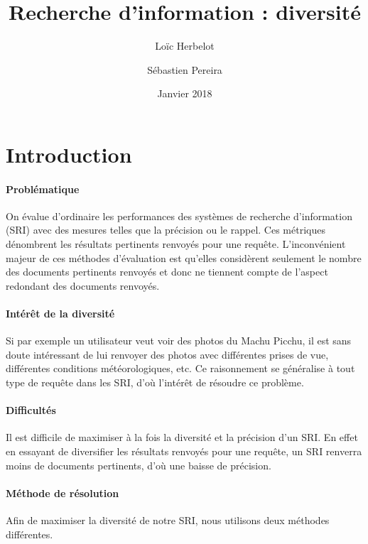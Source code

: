 \documentclass{article}
\title{Recherche d'information : diversité}
\date{Janvier 2018}
\author{
   Loïc Herbelot
   \and
   Sébastien Pereira
  }
\begin{document}
\maketitle 


\tableofcontents{}




\section{Introduction}

\paragraph{Problématique}

On évalue d'ordinaire les performances des systèmes de recherche d'information (SRI) avec des mesures telles que la précision ou le rappel. Ces métriques dénombrent les résultats pertinents renvoyés pour une requête. L'inconvénient majeur de ces méthodes d'évaluation est qu'elles considèrent seulement le nombre des documents pertinents renvoyés et donc ne tiennent compte de l'aspect redondant des documents renvoyés. 

\paragraph{Intérêt de la diversité}
Si par exemple un utilisateur veut voir des photos du Machu Picchu, il est sans doute intéressant de lui renvoyer des photos avec différentes prises de vue, différentes conditions météorologiques, etc. Ce raisonnement se généralise à tout type de requête dans les SRI, d'où l'intérêt de résoudre ce problème.
\paragraph{Difficultés}
Il est difficile de maximiser à la fois la diversité et la précision d'un SRI. En effet en essayant de diversifier les résultats renvoyés pour une requête, un SRI renverra moins de documents pertinents, d'où une baisse de précision.

\paragraph{Méthode de résolution}
Afin de maximiser la diversité de notre SRI, nous utilisons deux méthodes différentes.
\end{document}
